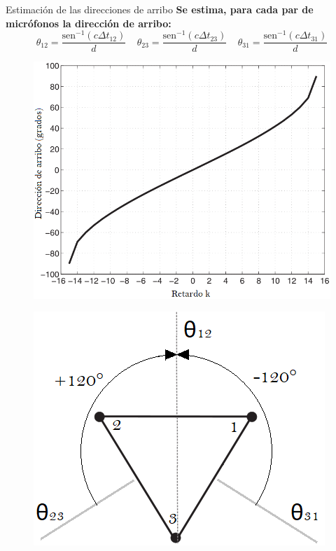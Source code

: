 \documentclass[12pt,aspectratio=169]{beamer}
\begin{document}
	\begin{frame}{Estimación de las direcciones de arribo}
		\textbf{Se estima, para cada par de micrófonos la dirección de arribo:}
		\begin{equation}
			\theta_{12} = \frac{\mathrm{sen}^{-1}(c \Delta t_{12})}{d}~~~~~\theta_{23} = \frac{\mathrm{sen}^{-1}(c \Delta t_{23})}{d}~~~~~\theta_{31} = \frac{\mathrm{sen}^{-1}(c \Delta t_{31})}{d}
		\end{equation}		
		\hspace{5mm}
		\begin{minipage}{70mm}
			\begin{figure}[h]
				\centering
				\includegraphics[width=0.9\linewidth]{figures/DOAvsDelay}
			\end{figure}
		\end{minipage}
		\hspace{10mm}
		\begin{minipage}{50mm}
			\begin{figure}[h]
				\centering
				\includegraphics[width=\linewidth]{figures/reference}
			\end{figure}
		\end{minipage}
		
	\end{frame}
	
\end{document}
